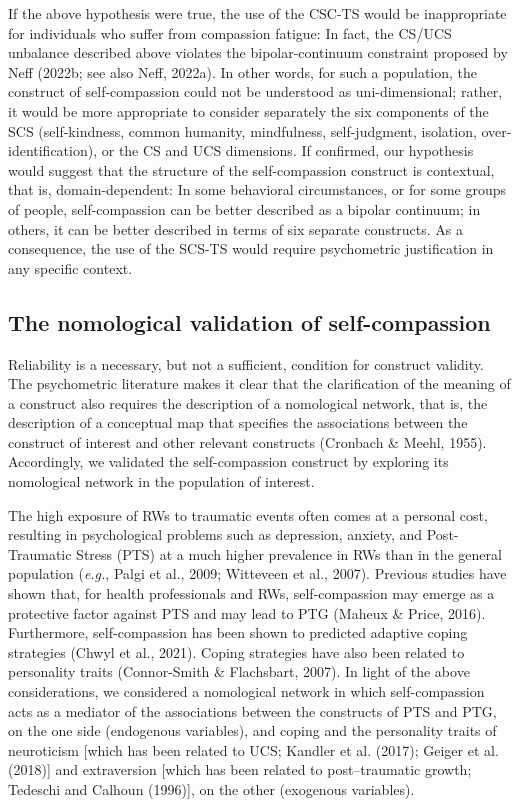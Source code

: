 \documentclass[
  man]{apa7}
\begin{document}
If the above hypothesis were true, the use of the CSC-TS would be inappropriate for individuals who suffer from compassion fatigue: In fact, the CS/UCS unbalance described above violates the bipolar-continuum constraint proposed by Neff (2022b; see also Neff, 2022a). In other words, for such a population, the construct of self-compassion could not be understood as uni-dimensional; rather, it would be more appropriate to consider separately the six components of the SCS (self-kindness, common humanity, mindfulness, self-judgment, isolation, over-identification), or the CS and UCS dimensions. If confirmed, our hypothesis would suggest that the structure of the self-compassion construct is contextual, that is, domain-dependent: In some behavioral circumstances, or for some groups of people, self-compassion can be better described as a bipolar continuum; in others, it can be better described in terms of six separate constructs. As a consequence, the use of the SCS-TS would require psychometric justification in any specific context.

\hypertarget{the-nomological-validation-of-self-compassion}{%
\subsection{The nomological validation of self-compassion}\label{the-nomological-validation-of-self-compassion}}

Reliability is a necessary, but not a sufficient, condition for construct validity.
The psychometric literature makes it clear that the clarification of the meaning of a construct also requires the description of a nomological network, that is, the description of a conceptual map that specifies the associations between the construct of interest and other relevant constructs (Cronbach \& Meehl, 1955). Accordingly, we validated the self-compassion construct by exploring its nomological network in the population of interest.

The high exposure of RWs to traumatic events often comes at a personal cost, resulting in psychological problems such as depression, anxiety, and Post-Traumatic Stress (PTS) at a much higher prevalence in RWs than in the general population (\emph{e.g.}, Palgi et al., 2009; Witteveen et al., 2007). Previous studies have shown that, for health professionals and RWs, self-compassion may emerge as a protective factor against PTS and may lead to PTG (Maheux \& Price, 2016). Furthermore, self-compassion has been shown to predicted adaptive coping strategies (Chwyl et al., 2021). Coping strategies have also been related to personality traits (Connor-Smith \& Flachsbart, 2007). In light of the above considerations, we considered a nomological network in which self-compassion acts as a mediator of the associations between the constructs of PTS and PTG, on the one side (endogenous variables), and coping and the personality traits of neuroticism {[}which has been related to UCS; Kandler et al. (2017); Geiger et al. (2018){]} and extraversion {[}which has been related to post--traumatic growth; Tedeschi and Calhoun (1996){]}, on the other (exogenous variables).
\end{document}
